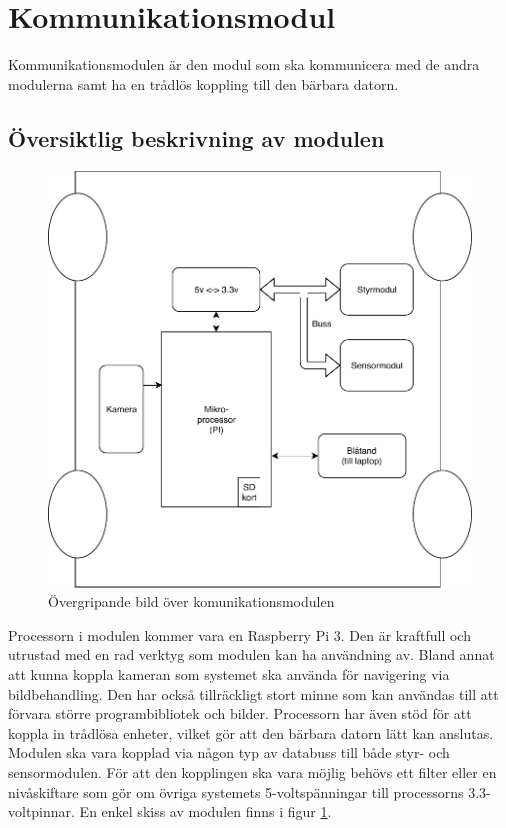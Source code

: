\documentclass[systemskiss/skiss.tex]{subfiles}
\begin{document}
\section{Kommunikationsmodul}
Kommunikationsmodulen är den modul som ska kommunicera med de andra modulerna
samt ha en trådlös koppling till den bärbara datorn. 

\subsection{Översiktlig beskrivning av modulen}
\begin{figure}[h]
    \centering
    \includegraphics[width=0.6\linewidth]{systemskiss/figures/kommodul.pdf}
    \caption{Övergripande bild över komunikationsmodulen}
    \label{fig:komskiss}
\end{figure}

\noindent
Processorn i modulen kommer vara en Raspberry Pi 3. Den är kraftfull och
utrustad med en rad verktyg som modulen kan ha användning av. Bland annat att
kunna koppla kameran som systemet ska använda för navigering via
bildbehandling. Den har också tillräckligt stort minne som kan användas till
att förvara större programbibliotek och bilder. Processorn har även stöd för
att koppla in trådlösa enheter, vilket gör att den bärbara datorn lätt kan
anslutas. Modulen ska vara kopplad via någon typ av databuss till både styr-
och sensormodulen. För att den kopplingen ska vara möjlig behövs ett filter
eller en nivåskiftare som gör om övriga systemets 5-voltspänningar till
processorns 3.3-voltpinnar.  En enkel skiss av modulen finns i figur
\ref{fig:komskiss}.
\end{document}
